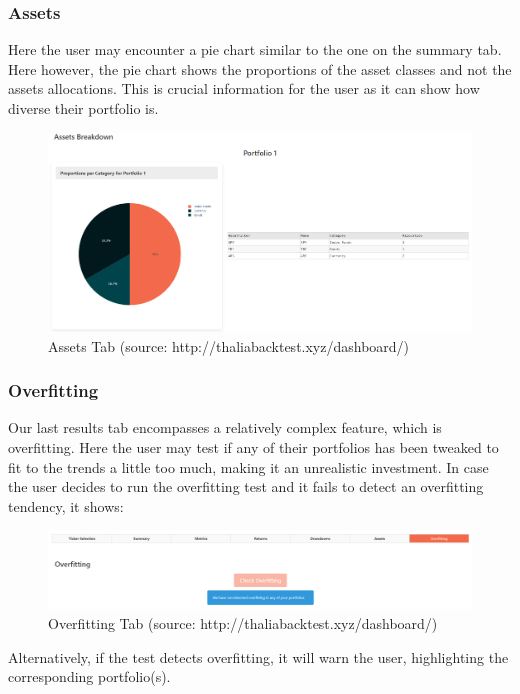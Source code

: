 \documentclass[main.tex]{subfiles}
\begin{document}
\subsubsection{Assets}

Here the user may encounter a pie chart similar to the one on the summary tab. Here however, the pie chart shows the proportions of the asset classes and not the assets allocations. This is crucial information for the user as it can show how diverse their portfolio is.

\begin{figure}[H]
   \centering
   \includegraphics[width=\textwidth]{08Appendices/081User/081Pictures/assets.png}
   \caption{Assets Tab (source: http://thaliabacktest.xyz/dashboard/)}
   \label{assets_tab}
\end{figure}

\subsubsection{Overfitting}

Our last results tab encompasses a relatively complex feature, which is overfitting. Here the user may test if any of their portfolios has been tweaked to fit to the trends a little too much, making it an unrealistic investment. In case the user decides to run the overfitting test and it fails to detect an overfitting tendency, it shows:

\begin{figure}[H]
   \centering
   \includegraphics[width=\textwidth]{08Appendices/081User/081Pictures/overfitting.png}
   \caption{Overfitting Tab (source: http://thaliabacktest.xyz/dashboard/)}
   \label{overfitting}
\end{figure}

Alternatively, if the test detects overfitting, it will warn the user, highlighting the corresponding portfolio(s).
\end{document}
